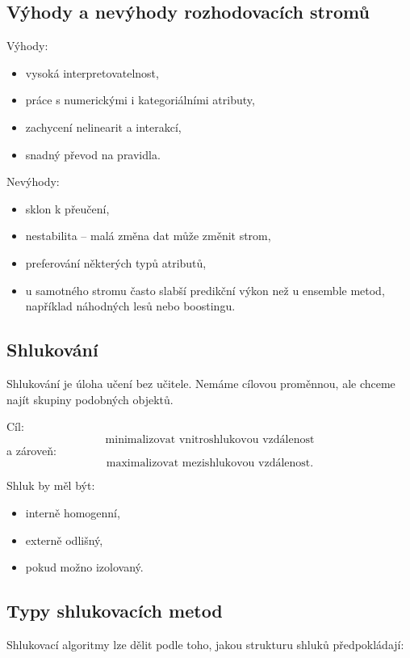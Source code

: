 \subsection{Výhody a nevýhody rozhodovacích stromů}

Výhody:
\begin{itemize}
    \item vysoká interpretovatelnost,
    \item práce s numerickými i kategoriálními atributy,
    \item zachycení nelinearit a interakcí,
    \item snadný převod na pravidla.
\end{itemize}

Nevýhody:
\begin{itemize}
    \item sklon k přeučení,
    \item nestabilita -- malá změna dat může změnit strom,
    \item preferování některých typů atributů,
    \item u samotného stromu často slabší predikční výkon než u ensemble metod, například náhodných lesů
    nebo boostingu.
\end{itemize}

\subsection{Shlukování}

Shlukování je úloha učení bez učitele. Nemáme cílovou proměnnou, ale chceme najít skupiny podobných objektů.

Cíl:
\[
\text{minimalizovat vnitroshlukovou vzdálenost}
\]
a zároveň:
\[
\text{maximalizovat mezishlukovou vzdálenost}.
\]

Shluk by měl být:
\begin{itemize}
    \item interně homogenní,
    \item externě odlišný,
    \item pokud možno izolovaný.
\end{itemize}

\subsection{Typy shlukovacích metod}

Shlukovací algoritmy lze dělit podle toho, jakou strukturu shluků předpokládají:


